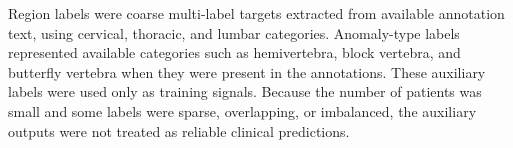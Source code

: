 Region labels were coarse multi-label targets extracted from available annotation text, using cervical, thoracic, and lumbar categories. Anomaly-type labels represented available categories such as hemivertebra, block vertebra, and butterfly vertebra when they were present in the annotations. These auxiliary labels were used only as training signals. Because the number of patients was small and some labels were sparse, overlapping, or imbalanced, the auxiliary outputs were not treated as reliable clinical predictions.
